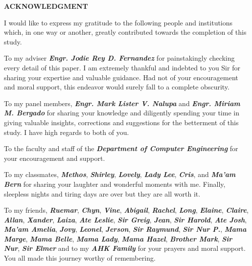 \begin{center}
{\bf ACKNOWLEDGMENT}\\[24pt]
\end{center}
{\baselineskip

I would like to express my gratitude to the following people and institutions which, in one way or another, greatly contributed towards the completion of this study. 

To my adviser \textbf{\textit{Engr. Jodie Rey D. Fernandez}} for painstakingly checking every detail of this paper. I am extremely thankful and indebted to you Sir for sharing your expertise and valuable guidance. Had not of your encouragement and moral support, this endeavor would surely fall to a complete obscurity.

To my panel members, \textbf{\textit{Engr. Mark Lister V. Nalupa}} and \textbf{\textit{Engr. Miriam M. Bergado}} for sharing your knowledge and diligently spending  your time in giving valuable insights, corrections and suggestions for the betterment of this study. I have high regards to both of you.

To the faculty and staff of the \textbf{\textit{Department of Computer Engineering}} for your encouragement and support.

To my classmates, \textbf{\textit{Methos}}, \textbf{\textit{Shirley}}, \textbf{\textit{Lovely}}, \textbf{\textit{Lady Lee}}, \textbf{\textit{Cris}}, and \textbf{\textit{Ma'am Bern}} for sharing your laughter and wonderful moments with me. Finally, sleepless nights and tiring days are over but they are all worth it.

To my friends, \textbf{\textit{Ruemar}}, \textbf{\textit{Chyn}}, \textbf{\textit{Vine}}, \textbf{\textit{Abigail}}, \textbf{\textit{Rachel}}, \textbf{\textit{Long}}, \textbf{\textit{Elaine}}, \textbf{\textit{Claire}}, \textbf{\textit{Allan}}, \textbf{\textit{Xander}}, \textbf{\textit{Laiza}}, \textbf{\textit{Ate Leslie}}, \textbf{\textit{Sir Greig}}, \textbf{\textit{Jean}}, \textbf{\textit{Sir Harold}}, \textbf{\textit{Ate Josh}}, \textbf{\textit{Ma'am Amelia}}, \textbf{\textit{Jovy}}, \textbf{\textit{Leonel}}, \textbf{\textit{Jerson}}, \textbf{\textit{Sir Raymund}}, \textbf{\textit{Sir Nur P.}}, \textbf{\textit{Mama Marge}}, \textbf{\textit{Mama Belle}}, \textbf{\textit{Mama Lady}}, \textbf{\textit{Mama Hazel}}, \textbf{\textit{Brother Mark}}, \textbf{\textit{Sir Nur}}, \textbf{\textit{Sir Elmer}} and to my \textbf{\textit{AHK Family}} for your prayers and moral support. You all made this journey worthy of remembering.

}
